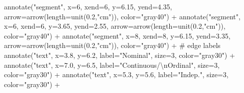 \documentclass[
  12pt,
  letterpaper,
]{book}
\newenvironment{Shaded}{\begin{snugshade}}{\end{snugshade}}
\newcommand{\AttributeTok}[1]{\textcolor[rgb]{0.40,0.45,0.13}{#1}}
\newcommand{\CommentTok}[1]{\textcolor[rgb]{0.37,0.37,0.37}{#1}}
\newcommand{\DecValTok}[1]{\textcolor[rgb]{0.68,0.00,0.00}{#1}}
\newcommand{\FloatTok}[1]{\textcolor[rgb]{0.68,0.00,0.00}{#1}}
\newcommand{\FunctionTok}[1]{\textcolor[rgb]{0.28,0.35,0.67}{#1}}
\newcommand{\NormalTok}[1]{\textcolor[rgb]{0.00,0.23,0.31}{#1}}
\newcommand{\SpecialCharTok}[1]{\textcolor[rgb]{0.37,0.37,0.37}{#1}}
\newcommand{\StringTok}[1]{\textcolor[rgb]{0.13,0.47,0.30}{#1}}
\begin{document}
\begin{Shaded}
\begin{Highlighting}[]
  \FunctionTok{annotate}\NormalTok{(}\StringTok{"segment"}\NormalTok{, }\AttributeTok{x=}\DecValTok{6}\NormalTok{, }\AttributeTok{xend=}\DecValTok{6}\NormalTok{, }\AttributeTok{y=}\FloatTok{6.15}\NormalTok{, }\AttributeTok{yend=}\FloatTok{4.35}\NormalTok{,}
           \AttributeTok{arrow=}\FunctionTok{arrow}\NormalTok{(}\AttributeTok{length=}\FunctionTok{unit}\NormalTok{(}\FloatTok{0.2}\NormalTok{,}\StringTok{"cm"}\NormalTok{)), }\AttributeTok{color=}\StringTok{"gray40"}\NormalTok{) }\SpecialCharTok{+}
  \FunctionTok{annotate}\NormalTok{(}\StringTok{"segment"}\NormalTok{, }\AttributeTok{x=}\DecValTok{6}\NormalTok{, }\AttributeTok{xend=}\DecValTok{6}\NormalTok{, }\AttributeTok{y=}\FloatTok{3.65}\NormalTok{, }\AttributeTok{yend=}\FloatTok{2.55}\NormalTok{,}
           \AttributeTok{arrow=}\FunctionTok{arrow}\NormalTok{(}\AttributeTok{length=}\FunctionTok{unit}\NormalTok{(}\FloatTok{0.2}\NormalTok{,}\StringTok{"cm"}\NormalTok{)), }\AttributeTok{color=}\StringTok{"gray40"}\NormalTok{) }\SpecialCharTok{+}
  \FunctionTok{annotate}\NormalTok{(}\StringTok{"segment"}\NormalTok{, }\AttributeTok{x=}\DecValTok{8}\NormalTok{, }\AttributeTok{xend=}\DecValTok{8}\NormalTok{, }\AttributeTok{y=}\FloatTok{6.15}\NormalTok{, }\AttributeTok{yend=}\FloatTok{3.35}\NormalTok{,}
           \AttributeTok{arrow=}\FunctionTok{arrow}\NormalTok{(}\AttributeTok{length=}\FunctionTok{unit}\NormalTok{(}\FloatTok{0.2}\NormalTok{,}\StringTok{"cm"}\NormalTok{)), }\AttributeTok{color=}\StringTok{"gray40"}\NormalTok{) }\SpecialCharTok{+}
  \CommentTok{\# edge labels}
  \FunctionTok{annotate}\NormalTok{(}\StringTok{"text"}\NormalTok{, }\AttributeTok{x=}\FloatTok{3.8}\NormalTok{, }\AttributeTok{y=}\FloatTok{6.2}\NormalTok{, }\AttributeTok{label=}\StringTok{"Nominal"}\NormalTok{, }\AttributeTok{size=}\DecValTok{3}\NormalTok{, }\AttributeTok{color=}\StringTok{"gray30"}\NormalTok{) }\SpecialCharTok{+}
  \FunctionTok{annotate}\NormalTok{(}\StringTok{"text"}\NormalTok{, }\AttributeTok{x=}\FloatTok{7.0}\NormalTok{, }\AttributeTok{y=}\FloatTok{6.5}\NormalTok{, }\AttributeTok{label=}\StringTok{"Continuous/}\SpecialCharTok{\textbackslash{}n}\StringTok{Ordinal"}\NormalTok{, }\AttributeTok{size=}\DecValTok{3}\NormalTok{, }\AttributeTok{color=}\StringTok{"gray30"}\NormalTok{) }\SpecialCharTok{+}
  \FunctionTok{annotate}\NormalTok{(}\StringTok{"text"}\NormalTok{, }\AttributeTok{x=}\FloatTok{5.3}\NormalTok{, }\AttributeTok{y=}\FloatTok{5.6}\NormalTok{, }\AttributeTok{label=}\StringTok{"Indep."}\NormalTok{, }\AttributeTok{size=}\DecValTok{3}\NormalTok{, }\AttributeTok{color=}\StringTok{"gray30"}\NormalTok{) }\SpecialCharTok{+}

\end{Highlighting}
\end{Shaded}
\end{document}
